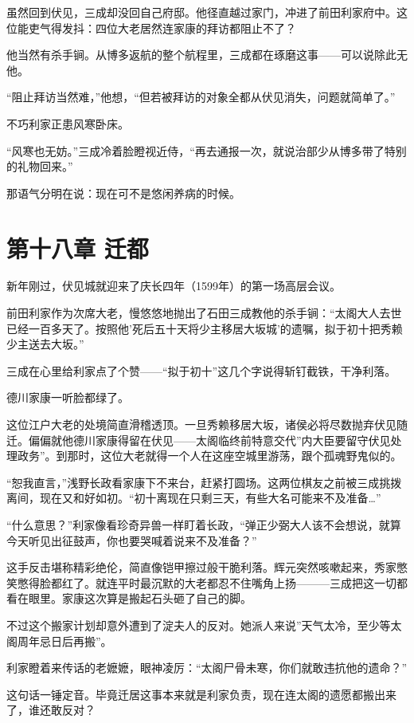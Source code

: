 \documentclass[
]{book}
\begin{document}
虽然回到伏见，三成却没回自己府邸。他径直越过家门，冲进了前田利家府中。这位能吏气得发抖：四位大老居然连家康的拜访都阻止不了？

他当然有杀手锏。从博多返航的整个航程里，三成都在琢磨这事------可以说除此无他。

``阻止拜访当然难，''他想，``但若被拜访的对象全都从伏见消失，问题就简单了。''

不巧利家正患风寒卧床。

``风寒也无妨。''三成冷着脸瞪视近侍，``再去通报一次，就说治部少从博多带了特别的礼物回来。''

那语气分明在说：现在可不是悠闲养病的时候。

\chapter*{第十八章 迁都}\label{ux7b2cux5341ux516bux7ae0-ux8fc1ux90fd}

新年刚过，伏见城就迎来了庆长四年（1599年）的第一场高层会议。

前田利家作为次席大老，慢悠悠地抛出了石田三成教他的杀手锏：``太阁大人去世已经一百多天了。按照他'死后五十天将少主移居大坂城'的遗嘱，拟于初十把秀赖少主送去大坂。''

三成在心里给利家点了个赞------``拟于初十''这几个字说得斩钉截铁，干净利落。

德川家康一听脸都绿了。

这位江户大老的处境简直滑稽透顶。一旦秀赖移居大坂，诸侯必将尽数抛弃伏见随迁。偏偏就他德川家康得留在伏见------太阁临终前特意交代''内大臣要留守伏见处理政务''。到那时，这位大老就得一个人在这座空城里游荡，跟个孤魂野鬼似的。

``恕我直言，''浅野长政看家康下不来台，赶紧打圆场。这两位棋友之前被三成挑拨离间，现在又和好如初。``初十离现在只剩三天，有些大名可能来不及准备\ldots{}''

``什么意思？''利家像看珍奇异兽一样盯着长政，``弹正少弼大人该不会想说，就算今天听见出征鼓声，你也要哭喊着说来不及准备？''

这手反击堪称精彩绝伦，简直像铠甲擦过般干脆利落。辉元突然咳嗽起来，秀家憋笑憋得脸都红了。就连平时最沉默的大老都忍不住嘴角上扬---------三成把这一切都看在眼里。家康这次算是搬起石头砸了自己的脚。

不过这个搬家计划却意外遭到了淀夫人的反对。她派人来说''天气太冷，至少等太阁周年忌日后再搬''。

利家瞪着来传话的老嬷嬷，眼神凌厉：``太阁尸骨未寒，你们就敢违抗他的遗命？''

这句话一锤定音。毕竟迁居这事本来就是利家负责，现在连太阁的遗愿都搬出来了，谁还敢反对？
\end{document}
